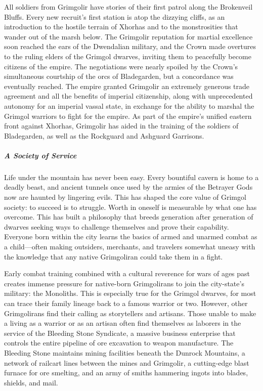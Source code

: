 \documentclass[10pt,a4paper,twoside,bg=print,twocolumn,openany,nodeprecatedcode]{dndbook}
\begin{document}
All soldiers from Grimgolir have stories of their first patrol along the Brokenveil Bluffs. Every new recruit's first station is atop the dizzying cliffs, as an introduction to the hostile terrain of Xhorhas and to the monstrosities that wander out of the marsh below. The Grimgolir reputation for martial excellence soon reached the ears of the Dwendalian military, and the Crown made overtures to the ruling elders of the Grimgol dwarves, inviting them to peacefully become citizens of the empire. The negotiations were nearly spoiled by the Crown's simultaneous courtship of the orcs of Bladegarden, but a concordance was eventually reached. The empire granted Grimgolir an extremely generous trade agreement and all the benefits of imperial citizenship, along with unprecedented autonomy for an imperial vassal state, in exchange for the ability to marshal the Grimgol warriors to fight for the empire. As part of the empire's unified eastern front against Xhorhas, Grimgolir has aided in the training of the soldiers of Bladegarden, as well as the Rockguard and Ashguard Garrisons.

\subparagraph{A Society of Service}
Life under the mountain has never been easy. Every bountiful cavern is home to a deadly beast, and ancient tunnels once used by the armies of the Betrayer Gods now are haunted by lingering evils. This has shaped the core value of Grimgol society: to succeed is to struggle. Worth in oneself is measurable by what one has overcome. This has built a philosophy that breeds generation after generation of dwarves seeking ways to challenge themselves and prove their capability. Everyone born within the city learns the basics of armed and unarmed combat as a child—often making outsiders, merchants, and travelers somewhat uneasy with the knowledge that any native Grimgoliran could take them in a fight.

Early combat training combined with a cultural reverence for wars of ages past creates immense pressure for native-born Grimgolirans to join the city-state's military: the Monoliths. This is especially true for the Grimgol dwarves, for most can trace their family lineage back to a famous warrior or two. However, other Grimgolirans find their calling as storytellers and artisans. Those unable to make a living as a warrior or as an artisan often find themselves as laborers in the service of the Bleeding Stone Syndicate, a massive business enterprise that controls the entire pipeline of ore excavation to weapon manufacture. The Bleeding Stone maintains mining facilities beneath the Dunrock Mountains, a network of railcart lines between the mines and Grimgolir, a cutting-edge blast furnace for ore smelting, and an army of smiths hammering ingots into blades, shields, and mail.
\end{document}
